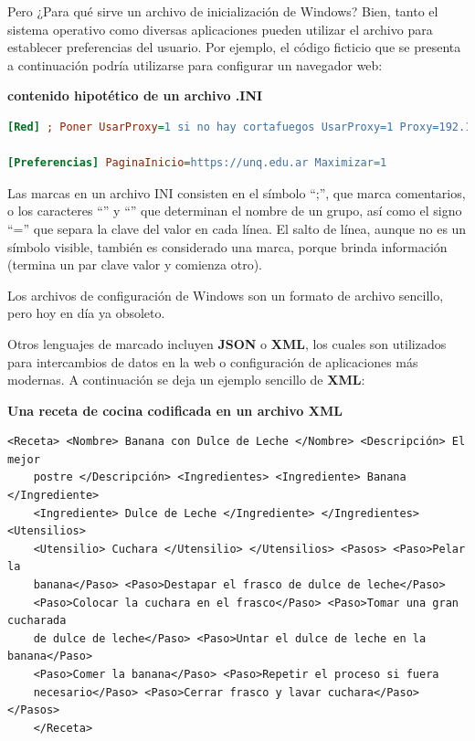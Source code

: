 Pero ¿Para qué sirve un archivo de inicialización de Windows? Bien, tanto el
sistema operativo como diversas aplicaciones pueden utilizar el archivo para
establecer preferencias del usuario. Por ejemplo, el código ficticio que se
presenta a continuación podría utilizarse para configurar un navegador web:

\begin{example}

    \textbf{contenido hipotético de un archivo .INI}

    \begin{lstlisting}[language=ini]
[Red] ; Poner UsarProxy=1 si no hay cortafuegos UsarProxy=1 Proxy=192.168.0.1

[Preferencias] PaginaInicio=https://unq.edu.ar Maximizar=1
    \end{lstlisting}
\end{example}

Las marcas en un archivo INI consisten en el símbolo ``;'', que marca
comentarios, o los caracteres ``\lbrack'' y ``\rbrack'' que determinan el nombre
de un grupo, así como el signo ``='' que separa la clave del valor en cada
línea. El salto de línea, aunque no es un símbolo visible, también es
considerado una marca, porque brinda información (termina un par clave valor y
comienza otro).

Los archivos de configuración de Windows son un formato de archivo sencillo,
pero hoy en día ya obsoleto.

Otros lenguajes de marcado incluyen \textbf{JSON} o \textbf{XML}, los cuales son
utilizados para intercambios de datos en la web o configuración de aplicaciones
más modernas. A continuación se deja un ejemplo sencillo de
\textbf{XML}:\autocite{marshal_2000}

\begin{example}

    \textbf{Una receta de cocina codificada en un archivo XML}


    \begin{lstlisting}[language=XHTML]
<Receta> <Nombre> Banana con Dulce de Leche </Nombre> <Descripción> El mejor
    postre </Descripción> <Ingredientes> <Ingrediente> Banana </Ingrediente>
    <Ingrediente> Dulce de Leche </Ingrediente> </Ingredientes> <Utensilios>
    <Utensilio> Cuchara </Utensilio> </Utensilios> <Pasos> <Paso>Pelar la
    banana</Paso> <Paso>Destapar el frasco de dulce de leche</Paso>
    <Paso>Colocar la cuchara en el frasco</Paso> <Paso>Tomar una gran cucharada
    de dulce de leche</Paso> <Paso>Untar el dulce de leche en la banana</Paso>
    <Paso>Comer la banana</Paso> <Paso>Repetir el proceso si fuera
    necesario</Paso> <Paso>Cerrar frasco y lavar cuchara</Paso> </Pasos>
    </Receta>
    \end{lstlisting}

\end{example}

